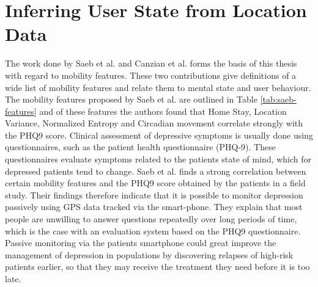 \section{Inferring User State from Location Data}





The work done by Saeb et al. \cite{Saeb2015, saeb2016} and Canzian et al. \cite{Canzian2015} forms the basis of this thesis with regard to mobility features. These two contributions give definitions of a wide list of mobility features and relate them to mental state and user behaviour. The mobility features proposed by Saeb et al. are outlined in Table \ref{tab:saeb-features} and of these features the authors found that Home Stay, Location Variance, Normalized Entropy and Circadian movement correlate strongly with the PHQ9 score. Clinical assessment of depressive symptoms is usually done using questionnaires, such as the patient health questionnaire (PHQ-9). These questionnaires evaluate symptoms related to the patients state of mind, which for depressed patients tend to change. Saeb et al. finds a strong correlation between certain mobility features and the PHQ9 score obtained by the patients in a field study. Their findings therefore indicate that it is possible to monitor depression passively using GPS data tracked via the smart-phone. They explain that most people are unwilling to answer questions repeatedly over long periods of time, which is the case with an evaluation system based on the PHQ9 questionnaire. Passive monitoring via the patients smartphone could great improve the management of depression in populations by discovering relapses of high-risk patients earlier, so that they may receive the treatment they need before it is too late. 

